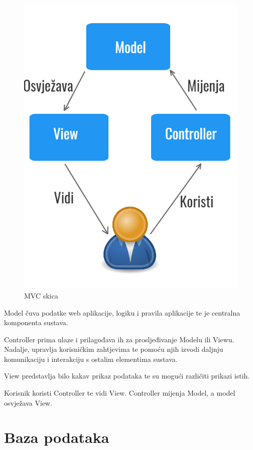 		\begin{figure}[H]
					\includegraphics[scale=0.6]{slike/mvcskica.png}
					\centering
					\caption{MVC skica}
					\label{fig:MVC-skica}
		\end{figure}
		
		
		Model čuva podatke web aplikacije, logiku i pravila aplikacije te je centralna komponenta sustava. 
		
		Controller prima ulaze i prilagođava ih za prosljeđivanje Modelu ili Viewu. Nadalje, upravlja korisničkim zahtjevima te pomoću njih izvodi daljnju komunikaciju i interakciju s ostalim elementima sustava. 
		
		View predstavlja bilo kakav prikaz podataka te su mogući različiti prikazi istih. 
		
		Korisnik koristi Controller te vidi View. Controller mijenja Model, a model osvježava View.
		\newpage
        
			
		\section{Baza podataka}
		
